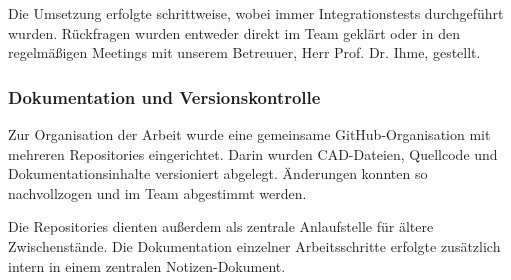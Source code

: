 Die Umsetzung erfolgte schrittweise, wobei immer Integrationstests durchgeführt wurden. Rückfragen wurden entweder direkt im Team geklärt oder in den regelmäßigen Meetings mit unserem Betreuuer, Herr Prof. Dr. Ihme, gestellt. 

\subsubsection{Dokumentation und Versionskontrolle}

Zur Organisation der Arbeit wurde eine gemeinsame GitHub-Organisation mit mehreren Repositories eingerichtet. Darin wurden CAD-Dateien, Quellcode und Dokumentationsinhalte versioniert abgelegt. Änderungen konnten so nachvollzogen und im Team abgestimmt werden.

Die Repositories dienten außerdem als zentrale Anlaufstelle für ältere Zwischenstände. Die Dokumentation einzelner Arbeitsschritte erfolgte zusätzlich intern in einem zentralen Notizen-Dokument.
